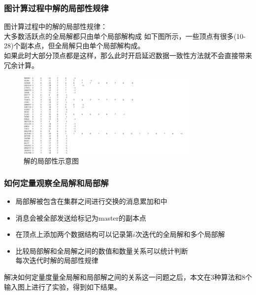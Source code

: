 \documentclass[10pt]{beamer}
\begin{document}
\begin{frame}%
  \frametitle{图计算过程中解的局部性规律}
  \begin{block}
    {图计算过程中的解的局部性规律：\\大多数活跃点的全局解都只由单个局部解构成}
    如下图所示，一些顶点有很多(10-28)个副本点，但全局解只由单个局部解构成。\\
    如果此时大部分顶点都是这样，那么此时开启延迟数据一致性方法就不会直接带来冗余计算。
  \end{block}
  \begin{figure}[H]
    \centering
    \includegraphics[width=0.8\textwidth]{Img/local_sssp}
    \caption[]{解的局部性示意图}
  \end{figure}
\end{frame}
\begin{frame}%
  \frametitle{如何定量观察全局解和局部解}
  \begin{block}
    {}
    \begin{itemize}
      \item 局部解被包含在集群之间进行交换的消息累加和中
      \item 消息会被全部发送给标记为master的副本点
      \item 在顶点上添加两个数据结构可以记录第$i$次迭代的全局解和多个局部解
      \item 比较局部解和全局解之间的数值和数量关系可以统计判断\\
      每次迭代时解的局部性规律
    \end{itemize}
  \end{block}
  解决如何定量度量全局解和局部解之间的关系这一问题之后，本文在3种算法和8个输入图上进行了实验，得到如下结果。
\end{frame}
\end{document}
